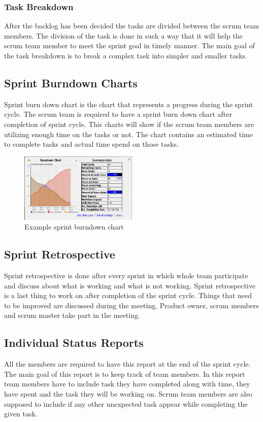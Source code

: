 \subsubsection{Task Breakdown}
After the backlog has been decided the tasks are divided between the scrum team members. The division of the task is done in such a way that it will help the scrum team member to meet the sprint goal in timely manner. The main goal of the task breakdown is to break a complex task into simpler and smaller tasks.

\subsection{Sprint Burndown Charts}
Sprint burn down chart is the chart that represents a progress during the sprint cycle. The scrum team is required to have a sprint burn down chart after completion of sprint cycle. This charts will show if the scrum team members are utilizing enough time on the tasks or not. The chart contains an estimated time to complete tasks and actual time spend on those tasks.

\begin{figure}[h!]
    \centering
    \includegraphics[width=0.5\textwidth]{images/Test_Image}
    \caption{Example sprint burndown chart}
\end{figure}

\subsection{Sprint Retrospective}
Sprint retrospective is done after every sprint in which whole team participate and discuss about what is working and what is not working. Sprint retrospective is a last thing to work on after completion of the sprint cycle. Things that need to be improved are discussed during the meeting. Product owner, scrum members and scrum master take part in the meeting. 

\subsection{Individual Status Reports}
All the members are required to have this report at the end of the sprint cycle. The main goal of this report is to keep track of team members. In this report team members have to include task they have completed along with time, they have spent and the task they will be working on. Scrum team members are also supposed to include if any other unexpected task appear while completing the given task.

